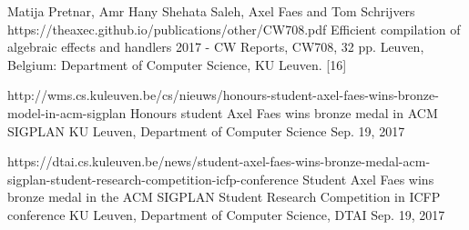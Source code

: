 \begin{cvpapers}
\end{cvpapers}\begin{cvpapers}
\cvpaper 
{Matija Pretnar, Amr Hany Shehata Saleh, Axel Faes and Tom Schrijvers}
{https://theaxec.github.io/publications/other/CW708.pdf}
{Efficient compilation of algebraic effects and handlers}
{2017 - CW Reports, CW708, 32 pp. Leuven, Belgium: Department of Computer Science, KU Leuven.}
{[16]}


\end{cvpapers}\begin{cvnews}
\cvnew 
{http://wms.cs.kuleuven.be/cs/nieuws/honours-student-axel-faes-wins-bronze-model-in-acm-sigplan}
{Honours student Axel Faes wins bronze medal in ACM SIGPLAN}
{KU Leuven, Department of Computer Science}
{Sep. 19, 2017}

\cvnew 
{https://dtai.cs.kuleuven.be/news/student-axel-faes-wins-bronze-medal-acm-sigplan-student-research-competition-icfp-conference}
{Student Axel Faes wins bronze medal in the ACM SIGPLAN Student Research Competition in ICFP conference}
{KU Leuven, Department of Computer Science, DTAI}
{Sep. 19, 2017}


\end{cvnews}
